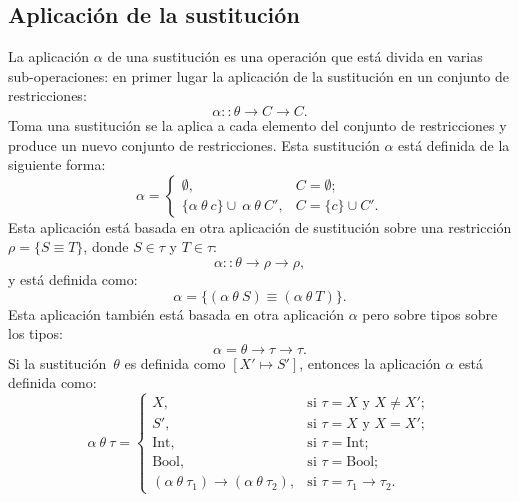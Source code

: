\documentclass{article}
\theoremstyle{definition}
\begin{document}
\subsection{Aplicación de la sustitución}
\label{sec:aplsus}

La aplicación $\alpha$ de una sustitución es una operación que está
divida en varias sub-operaciones: en primer lugar la aplicación de la
sustitución en un conjunto de restricciones:
\begin{equation*}
  \alpha :: \theta \to C \to C.
\end{equation*}
Toma una sustitución se la aplica a cada elemento del conjunto de
restricciones y produce un nuevo conjunto de restricciones. Esta
sustitución $\alpha$ está definida de la siguiente forma:
\begin{equation*}
  \alpha =
  \begin{cases}
    \emptyset, & C = \emptyset;
    \\
    \{\alpha\  \theta\  c\} \cup\ \alpha\ \theta\ C', & C = \{c\} \cup
    C'.
  \end{cases}
\end{equation*}
Esta aplicación está basada en otra aplicación de sustitución sobre
una restricción $\rho = \{ S \equiv T \}$, donde $S \in \tau$ y $T \in
\tau$:
\begin{equation*}
  \alpha :: \theta \to \rho \to \rho,
\end{equation*}
y está definida como:
\begin{equation*}
  \alpha = \{(\alpha\ \theta\ S) \equiv (\alpha\ \theta\ T)\}.
\end{equation*}
Esta aplicación también está basada en otra aplicación $\alpha$ pero
sobre tipos sobre los tipos:
\begin{equation*}
  \alpha = \theta \to \tau \to \tau.
\end{equation*}
Si la sustitución~$\theta$ es definida como $[ X' \mapsto S']$,
entonces la aplicación $\alpha$ está definida como:
\begin{equation*}
  \alpha\ \theta\ \tau =
  \begin{cases}
    X, & \text{si $\tau = X$ y $X \neq X'$};
    \\
    S', & \text{si $\tau = X$ y $X = X'$};
    \\
    \text{Int}, & \text{si $\tau = \text{Int}$};
    \\
    \text{Bool}, & \text{si $\tau = \text{Bool}$}
    ;\\
    (\alpha\ \theta\ \tau_1) \to (\alpha\ \theta\ \tau_2), & \text{si
      $\tau = \tau_1 \to \tau_2$}.
  \end{cases}
\end{equation*}
\end{document}
